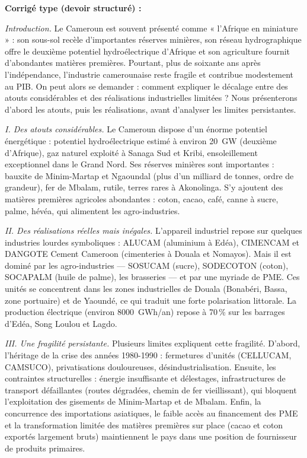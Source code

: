 \documentclass[11pt]{article}
\begin{document}
\begin{corrige}
\textbf{Corrigé type (devoir structuré) :}

\emph{Introduction.} Le Cameroun est souvent présenté comme « l'Afrique en miniature » : son sous-sol recèle d'importantes réserves minières, son réseau hydrographique offre le deuxième potentiel hydroélectrique d'Afrique et son agriculture fournit d'abondantes matières premières. Pourtant, plus de soixante ans après l'indépendance, l'industrie camerounaise reste fragile et contribue modestement au PIB. On peut alors se demander : comment expliquer le décalage entre des atouts considérables et des réalisations industrielles limitées ? Nous présenterons d'abord les atouts, puis les réalisations, avant d'analyser les limites persistantes.

\emph{I. Des atouts considérables.} Le Cameroun dispose d'un énorme potentiel énergétique : potentiel hydroélectrique estimé à environ \SI{20}{GW} (deuxième d'Afrique), gaz naturel exploité à Sanaga Sud et Kribi, ensoleillement exceptionnel dans le Grand Nord. Ses réserves minières sont importantes : bauxite de Minim-Martap et Ngaoundal (plus d'un milliard de tonnes, ordre de grandeur), fer de Mbalam, rutile, terres rares à Akonolinga. S'y ajoutent des matières premières agricoles abondantes : coton, cacao, café, canne à sucre, palme, hévéa, qui alimentent les agro-industries.

\emph{II. Des réalisations réelles mais inégales.} L'appareil industriel repose sur quelques industries lourdes symboliques : ALUCAM (aluminium à Edéa), CIMENCAM et DANGOTE Cement Cameroon (cimenteries à Douala et Nomayos). Mais il est dominé par les agro-industries — SOSUCAM (sucre), SODECOTON (coton), SOCAPALM (huile de palme), les brasseries — et par une myriade de PME. Ces unités se concentrent dans les zones industrielles de Douala (Bonabéri, Bassa, zone portuaire) et de Yaoundé, ce qui traduit une forte polarisation littorale. La production électrique (environ \SI{8000}{GWh}/an) repose à 70\,\% sur les barrages d'Edéa, Song Loulou et Lagdo.

\emph{III. Une fragilité persistante.} Plusieurs limites expliquent cette fragilité. D'abord, l'héritage de la crise des années 1980-1990 : fermetures d'unités (CELLUCAM, CAMSUCO), privatisations douloureuses, désindustrialisation. Ensuite, les contraintes structurelles : énergie insuffisante et délestages, infrastructures de transport défaillantes (routes dégradées, chemin de fer vieillissant), qui bloquent l'exploitation des gisements de Minim-Martap et de Mbalam. Enfin, la concurrence des importations asiatiques, le faible accès au financement des PME et la transformation limitée des matières premières sur place (cacao et coton exportés largement bruts) maintiennent le pays dans une position de fournisseur de produits primaires.


\end{corrige}
\end{document}
